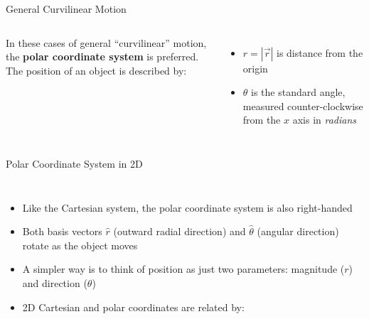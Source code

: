 \documentclass[12pt,compress,aspectratio=169]{beamer}
\begin{document}
\begin{frame}{General Curvilinear Motion}
  \begin{columns}
    

    In these cases of general ``curvilinear'' motion, the
    \textbf{polar coordinate system} is preferred. The position of an object is
    described by:


    \begin{itemize}
    \item\vspace{-.15in}$r=|\vec r|$ is distance from the origin
    \item $\theta$ is the standard angle, measured counter-clockwise from the
      $x$ axis in \emph{radians}
    \end{itemize}
  \end{columns}
\end{frame}



\begin{frame}{Polar Coordinate System in 2D}
  \begin{columns}
    

    \begin{itemize}
    \item Like the Cartesian system, the polar coordinate system is also
      right-handed
    \item Both basis vectors $\hat r$ (outward radial direction) and
      $\hat\theta$ (angular direction) rotate as the object moves
    \item A simpler way is to think of position as just two parameters:
      magnitude ($r$) and direction ($\theta$)
    \item 2D Cartesian and polar coordinates are related by:
      
      \vspace{-.35in}{\large
        \begin{align*}
          x&=r\cos\theta\\
          y&=r\sin\theta
        \end{align*}
      }
    \end{itemize}
  \end{columns}
\end{frame}
\end{document}
